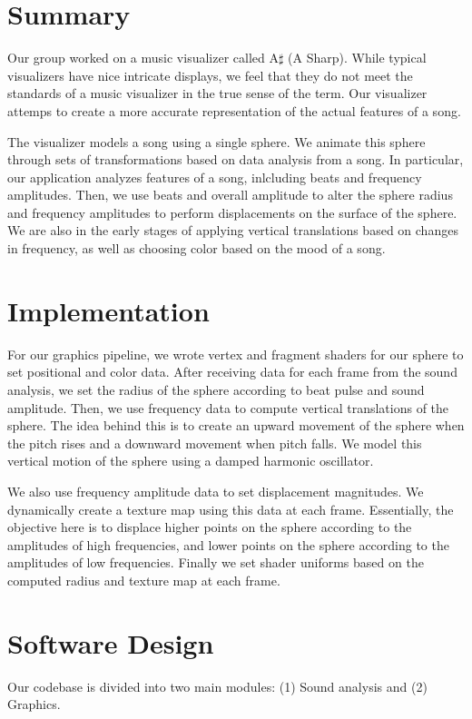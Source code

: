\documentclass{article}
\begin{document}
\section{Summary}

Our group worked on a music visualizer called A$\sharp$ (A Sharp). While typical visualizers have nice intricate displays, we feel that they do not meet the standards of a music visualizer in the true sense of the term. Our visualizer attemps to create a more accurate representation of the actual features of a song.

The visualizer models a song using a single sphere. We animate this sphere through sets of transformations based on data analysis from a song. In particular, our application analyzes features of a song, inlcluding beats and frequency amplitudes. Then, we use beats and overall amplitude to alter the sphere radius and frequency amplitudes to perform displacements on the surface of the sphere. We are also in the early stages of applying vertical translations based on changes in frequency, as well as choosing color based on the mood of a song.


\section{Implementation}

For our graphics pipeline, we wrote vertex and fragment shaders for our sphere to set positional and color data. After receiving data for each frame from the sound analysis, we set the radius of the sphere according to beat pulse and sound amplitude. Then, we use frequency data to compute vertical translations of the sphere. The idea behind this is to create an upward movement of the sphere when the pitch rises and a downward movement when pitch falls. We model this vertical motion of the sphere using a damped harmonic oscillator. 

We also use frequency amplitude data to set displacement magnitudes. We dynamically create a texture map using this data at each frame. Essentially, the objective here is to displace higher points on the sphere according to the amplitudes of high frequencies, and lower points on the sphere according to the amplitudes of low frequencies. Finally we set shader uniforms based on the computed radius and texture map at each frame.


\section{Software Design}
Our codebase is divided into two main modules: (1) Sound analysis and (2) Graphics. 
\end{document}

